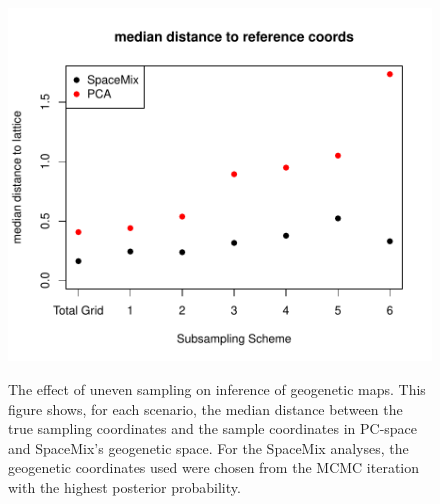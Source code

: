 \documentclass[10pt,letterpaper]{article}
\begin{document}
\begin{figure}
\centering
	{\includegraphics[width=\textwidth]{../figs/sims/median_dist_comp.pdf}}
	\caption{The effect of uneven sampling on inference of geogenetic maps.  
			This figure shows, for each scenario, the median distance 
			between the true sampling coordinates and the sample coordinates 
			in PC-space and SpaceMix's geogenetic space.  For the SpaceMix 
			analyses, the geogenetic coordinates used were chosen from the 
			MCMC iteration with the highest posterior probability.}
			\label{sfig:uneven_sampling_grid_med_dist}
\end{figure}
\end{document}
